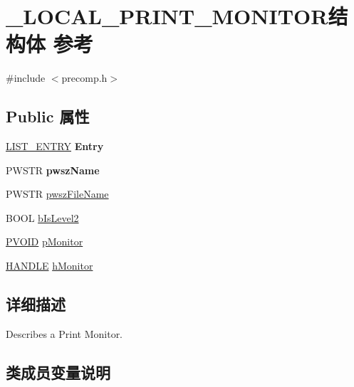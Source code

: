 \hypertarget{struct___l_o_c_a_l___p_r_i_n_t___m_o_n_i_t_o_r}{}\section{\+\_\+\+L\+O\+C\+A\+L\+\_\+\+P\+R\+I\+N\+T\+\_\+\+M\+O\+N\+I\+T\+O\+R结构体 参考}
\label{struct___l_o_c_a_l___p_r_i_n_t___m_o_n_i_t_o_r}


{\ttfamily \#include $<$precomp.\+h$>$}

\subsection*{Public 属性}
\begin{DoxyCompactItemize}
\item 
\mbox{\label{struct___l_o_c_a_l___p_r_i_n_t___m_o_n_i_t_o_r_a5b8b549791cd6a7ecae46b1a42a1868b}} 
\hyperlink{struct___l_i_s_t___e_n_t_r_y}{L\+I\+S\+T\+\_\+\+E\+N\+T\+RY} {\bfseries Entry}
\item 
\mbox{\label{struct___l_o_c_a_l___p_r_i_n_t___m_o_n_i_t_o_r_a76b0ee0b73bf81b98d3ed07f06b5d480}} 
P\+W\+S\+TR {\bfseries pwsz\+Name}
\item 
P\+W\+S\+TR \hyperlink{struct___l_o_c_a_l___p_r_i_n_t___m_o_n_i_t_o_r_ae4a8b291ae9de09d3cccbecc250bfa39}{pwsz\+File\+Name}
\item 
B\+O\+OL \hyperlink{struct___l_o_c_a_l___p_r_i_n_t___m_o_n_i_t_o_r_a49e51334df7420461362a569c1ad7ce9}{b\+Is\+Level2}
\item 
\hyperlink{interfacevoid}{P\+V\+O\+ID} \hyperlink{struct___l_o_c_a_l___p_r_i_n_t___m_o_n_i_t_o_r_ac8f01e22aa213651d143293c19f9fee2}{p\+Monitor}
\item 
\hyperlink{interfacevoid}{H\+A\+N\+D\+LE} \hyperlink{struct___l_o_c_a_l___p_r_i_n_t___m_o_n_i_t_o_r_ae0589bc1a3447178c6e9ae64394ea6e1}{h\+Monitor}
\end{DoxyCompactItemize}


\subsection{详细描述}
Describes a Print Monitor. 

\subsection{类成员变量说明}
\mbox{\label{struct___l_o_c_a_l___p_r_i_n_t___m_o_n_i_t_o_r_a49e51334df7420461362a569c1ad7ce9}} 
